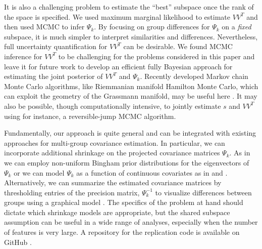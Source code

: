 \documentclass[12pt]{article}
\begin{document}
It is also a challenging problem to estimate the ``best'' subspace
once the rank of the space is specified.  We used maximum marginal
likelihood to estimate $VV^T$ and then used MCMC to
infer $\Psi_k$.  By focusing on group differences for $\Psi_k$ on a
\emph{fixed} subspace, it is much simpler to interpret similarities
and differences.  Nevertheless, full uncertainty quantification for
$VV^T$ can be desirable.  We found MCMC inference for $VV^T$ to be
challenging for the problems considered in this paper and leave it for
future work to develop an efficient fully Bayesian approach for
estimating the joint posterior of $VV^T$ and $\Psi_k$.  Recently
developed Markov chain Monte Carlo algorithms, like Riemmanian
manifold Hamilton Monte Carlo, which can exploit the geometry of the
Grassmann manifold, may be useful here \citep{Byrne2013,
  Girolami2011}.  It may also be possible, though computationally
intensive, to jointly estimate $s$ and $VV^T$ using for instance,
a reversible-jump MCMC algorithm.


Fundamentally, our approach is quite general and can be integrated
with existing approaches for multi-group covariance
estimation.  In particular, we can incorporate additional shrinkage on
the projected covariance matrices $\Psi_k$.  As in \citet{Hoff2009} we
can employ non-uniform Bingham prior distributions for the
eigenvectors of $\Psi_k$ or we can model $\Psi_k$ as a function of continuous
covariates as in \citet{Yin2010} and \citet{Hoff2011}.  Alternatively, we can
summarize the estimated covariance matrices by thresholding entries of
the precision matrix, $\Psi_k^{-1}$ to visualize differences between
groups using a graphical model \citep{Meinshausen2006}.  The specifics
of the problem at hand should dictate which shrinkage models are
appropriate, but the shared subspace assumption can be useful in a
wide range of analyses, especially when the number of features is very
large.  A repository for the replication code is available on GitHub \citep{FranksGit}.




\end{document}
